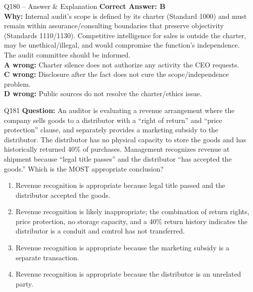 \documentclass[aspectratio=169,10pt]{beamer}
\begin{document}
	\begin{frame}[t]{Q180 -- Answer \& Explanation}
		\small
		\textbf{Correct Answer: B} \\[4pt]
		\textbf{Why:} Internal audit's scope is defined by its charter (Standard 1000) and must remain within assurance/consulting boundaries that preserve objectivity (Standards 1110/1130). Competitive intelligence for sales is outside the charter, may be unethical/illegal, and would compromise the function's independence. The audit committee should be informed. \\[4pt]
		\textbf{A wrong:} Charter silence does not authorize any activity the CEO requests. \\[2pt]
		\textbf{C wrong:} Disclosure after the fact does not cure the scope/independence problem. \\[2pt]
		\textbf{D wrong:} Public sources do not resolve the charter/ethics issue.
	\end{frame}
	
	\begin{frame}[t]{Q181}
		\small
		\textbf{Question:} An auditor is evaluating a revenue arrangement where the company sells goods to a distributor with a ``right of return'' and ``price protection'' clause, and separately provides a marketing subsidy to the distributor. The distributor has no physical capacity to store the goods and has historically returned 40\% of purchases. Management recognizes revenue at shipment because ``legal title passes'' and the distributor ``has accepted the goods.'' Which is the MOST appropriate conclusion?
		\begin{enumerate}[label=\Alph*.,itemsep=1pt,topsep=2pt]
			\item Revenue recognition is appropriate because legal title passed and the distributor accepted the goods.
			\item Revenue recognition is likely inappropriate; the combination of return rights, price protection, no storage capacity, and a 40\% return history indicates the distributor is a conduit and control has not transferred.
			\item Revenue recognition is appropriate because the marketing subsidy is a separate transaction.
			\item Revenue recognition is appropriate because the distributor is an unrelated party.
		\end{enumerate}
	\end{frame}
	
\end{document}
